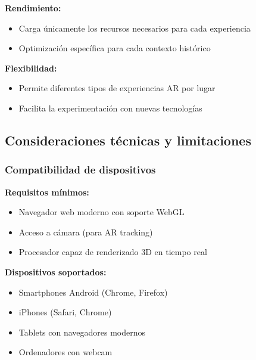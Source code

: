 \textbf{Rendimiento:}
\begin{itemize}
    \item Carga únicamente los recursos necesarios para cada experiencia
    \item Optimización específica para cada contexto histórico
\end{itemize}


\textbf{Flexibilidad:}
\begin{itemize}
    \item Permite diferentes tipos de experiencias AR por lugar
    \item Facilita la experimentación con nuevas tecnologías
\end{itemize}


\subsection{Consideraciones técnicas y limitaciones}


\subsubsection{Compatibilidad de dispositivos}


\textbf{Requisitos mínimos:}
\begin{itemize}
    \item Navegador web moderno con soporte WebGL
    \item Acceso a cámara (para AR tracking)
    \item Procesador capaz de renderizado 3D en tiempo real
\end{itemize}


\textbf{Dispositivos soportados:}
\begin{itemize}
    \item Smartphones Android (Chrome, Firefox)
    \item iPhones (Safari, Chrome)
    \item Tablets con navegadores modernos
    \item Ordenadores con webcam
\end{itemize}

